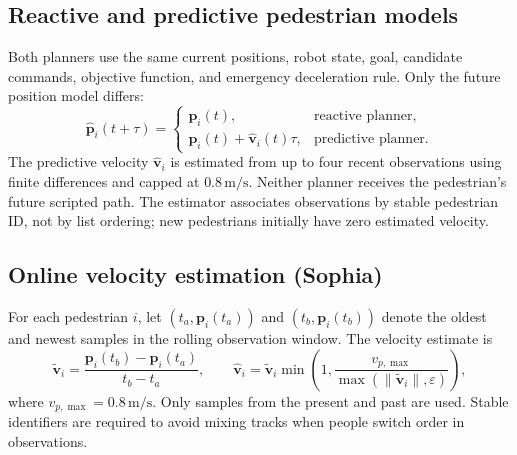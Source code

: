 \documentclass[11pt,a4paper]{article}
\begin{document}
\subsection{Reactive and predictive pedestrian models}
Both planners use the same current positions, robot state, goal, candidate commands, objective function, and emergency deceleration rule. Only the future position model differs:
\begin{equation}
\hat{\mathbf{p}}_i(t+\tau)=
\begin{cases}
\mathbf{p}_i(t), & \text{reactive planner},\\
\mathbf{p}_i(t)+\hat{\mathbf{v}}_i(t)\tau, & \text{predictive planner}.
\end{cases}
\label{eq:pedprediction}
\end{equation}
The predictive velocity \(\hat{\mathbf{v}}_i\) is estimated from up to four recent observations using finite differences and capped at \(0.8\,\mathrm{m/s}\). Neither planner receives the pedestrian's future scripted path. The estimator associates observations by stable pedestrian ID, not by list ordering; new pedestrians initially have zero estimated velocity.

\subsection{Online velocity estimation (Sophia)}
For each pedestrian $i$, let $(t_a,\mathbf p_i(t_a))$ and $(t_b,\mathbf p_i(t_b))$ denote the oldest and newest samples in the rolling observation window. The velocity estimate is
\begin{equation}
\widetilde{\mathbf v}_i = \frac{\mathbf p_i(t_b)-\mathbf p_i(t_a)}{t_b-t_a}, \qquad
\hat{\mathbf v}_i=\widetilde{\mathbf v}_i
\min\left(1,\frac{v_{p,\max}}{\max(\lVert\widetilde{\mathbf v}_i\rVert,\varepsilon)}\right),
\end{equation}
where $v_{p,\max}=0.8\,\mathrm{m/s}$. Only samples from the present and past are used. Stable identifiers are required to avoid mixing tracks when people switch order in observations.
\end{document}
